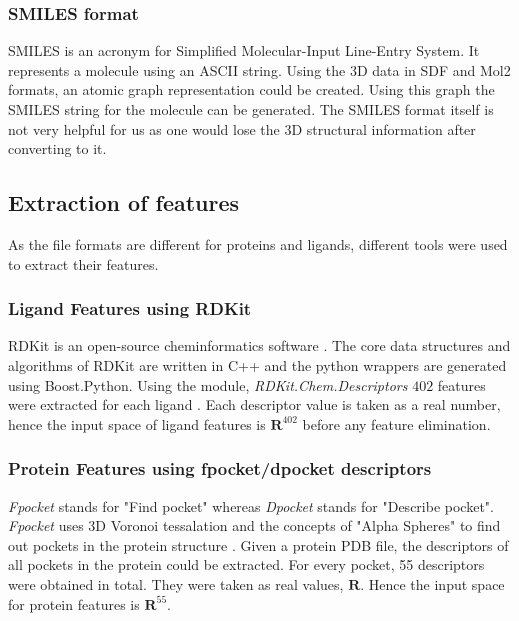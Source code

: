 \documentclass[11pt]{article}
\begin{document}
\subsubsection{SMILES format}
SMILES is an acronym for Simplified Molecular-Input Line-Entry System.
It represents a molecule using an ASCII string.
Using the 3D data in SDF and Mol2 formats,  an atomic graph representation could be created.
Using this graph the SMILES string for the molecule can be generated.
The SMILES format itself is not very helpful for us as one would lose the 3D structural information after converting to it.
\cite{smilesformat}

\subsection{Extraction of features}
As the file formats are different for proteins and ligands,  different tools were used to extract their features.
\subsubsection{Ligand Features using RDKit}
RDKit is an open-source cheminformatics software \cite{rdkitofficalpage}.
The core data structures and algorithms of RDKit are written in C++ and the
python wrappers are generated using Boost.Python.
Using the module, \textit{RDKit.Chem.Descriptors} $402$ features were extracted for each ligand \cite{rdkitbioinformaticsfreiburg}.
Each descriptor value is taken as a real number,  hence the input space of ligand features is $\mathbf{R}^{402}$ before any feature elimination.

\subsubsection{Protein Features using fpocket/dpocket descriptors}
\textit{Fpocket} stands for "Find pocket" whereas \textit{Dpocket} stands for "Describe pocket".
\textit{Fpocket} uses 3D Voronoi tessalation and the concepts of "Alpha Spheres" to find out pockets in the protein structure \cite{fpocketmanual} \cite{voronoitesselationshortvideo}.
Given a protein PDB file,  the descriptors of all pockets in the protein could be extracted.
For every pocket,  55 descriptors were obtained in total. They were taken as real values, $\mathbf{R}$.
Hence the input space for protein features is $\mathbf{R}^{55}$.
\end{document}
